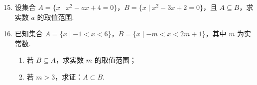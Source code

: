 \documentclass[a4paper,11pt]{article}
\begin{document}

\begin{enumerate}
\setcounter{enumi}{14}

\item 设集合 $A=\{x\mid x^2-ax+4=0\}$，$B=\{x\mid x^2-3x+2=0\}$，且 $A\subseteq B$，求实数 $a$ 的取值范围.


\ansspace[6]
\ansneed{7cm}
\item 已知集合 $A=\{x\mid -1<x<6\}$，$B=\{x\mid -m<x<2m+1\}$，其中 $m$ 为实常数.
\begin{enumerate}[label=(\arabic*)]
\item 若 $B\subseteq A$，求实数 $m$ 的取值范围；
\item 若 $m>3$，求证：$A\subset B$.
\end{enumerate}


\ansspace*[7]
\end{enumerate}
\end{document}
